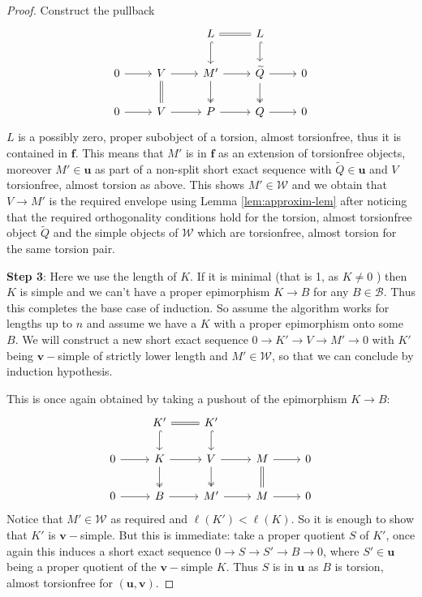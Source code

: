 \documentclass[11pt]{amsart}
\theoremstyle{definition}
\newcommand{\B}{\mathcal B}
\newcommand{\tpair}[2]{(\mathbf{#1}, \mathbf{#2})  }
\begin{document}
\begin{proof}
Construct the pullback
\[
\begin{tikzcd}
& & L \ar[r, equals] \ar[d, hook] & L \ar[d, hook] \\
0 \ar[r] & V  \ar[d, equals] \ar[r] & M' \ar[d, two heads] \ar[r] & \widetilde{Q} \ar[r] \ar[d, two heads] & 0 \\
0 \ar[r] & V  \ar[r] & P \ar[r] & Q \ar[r] & 0
\end{tikzcd}
\]
\( L \) is a possibly zero, proper subobject of a torsion, almost torsionfree, thus it is contained in \( \mathbf{f} \). This means that \( M' \) is in \( \mathbf{f} \) as an extension of torsionfree objects, moreover \( M' \in \mathbf{u} \) as part of a non-split short exact sequence with \( \widetilde{Q} \in \mathbf{u} \) and \( V \) torsionfree, almost  torsion as above. This shows \( M' \in \mathcal{W} \) and we obtain that \( V \to M' \) is the required envelope using Lemma \ref{lem:approxim-lem} after noticing that the required orthogonality conditions hold for the torsion, almost torsionfree object \( \widetilde{Q} \) and the simple objects of \( \mathcal{W} \) which are torsionfree, almost torsion for the same torsion pair. 

\noindent \textbf{Step 3}: Here we use the length of \( K \). If it is minimal (that is 1, as \( K \ne 0 \) ) then \( K \) is simple and we can't have a proper epimorphism \( K \to B \) for any \( B \in \B \). Thus this completes the base case of induction. So assume the algorithm works for lengths up to \( n \) and assume we have a \( K \) with a proper epimorphism onto some \( B \). We will construct a new short exact sequence \( 0 \to K' \to V \to M' \to 0 \) with \( K' \) being \( \mathbf{v}-\)simple of strictly lower length and \(M' \in \mathcal{W} \), so that we can conclude by induction hypothesis.  

This is once again obtained by taking a pushout of the epimorphism \( K \to B \):
\[
\begin{tikzcd}
 & K' \ar[r, equals] \ar[d, hook] & K' \ar[d, hook] \\
0 \ar[r] & K \ar[d, two heads] \ar[r] & V \ar[d, two heads] \ar[r] & M \ar[r] \ar[d, equals] & 0 \\
0 \ar[r] & B  \ar[r] & M' \ar[r] & M \ar[r] & 0
\end{tikzcd}
\] 
Notice that \( M' \in \mathcal{W} \) as required and \( \ell(K') < \ell(K) \). So it is enough to show that \( K' \) is \( \mathbf{v}-\)simple. But this is immediate: take a proper quotient \( S \) of \( K' \), once again this induces a short exact sequence \( 0 \to S \to S' \to B \to 0 \), where \( S' \in \mathbf{u} \) being a proper quotient of the \( \mathbf{v}-\)simple \( K \). Thus \( S \) is in \( \mathbf{u} \) as \( B \) is torsion, almost torsionfree for \( \tpair{u}{v} \). 
\end{proof}
\end{document}
